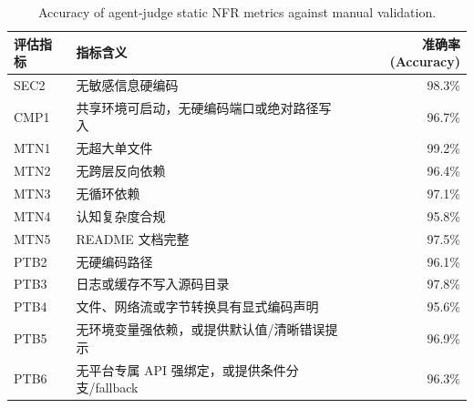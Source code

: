 \begin{table}[t]
\centering
\small
\caption{Accuracy of agent-judge static NFR metrics against manual validation.}
\label{tab:rq1-static-nfr-accuracy}
\begin{tabular}{llr}
\toprule
评估指标 & 指标含义 & 准确率 (Accuracy) \\
\midrule
SEC2 & 无敏感信息硬编码 & 98.3\% \\
CMP1 & 共享环境可启动，无硬编码端口或绝对路径写入 & 96.7\% \\
MTN1 & 无超大单文件 & 99.2\% \\
MTN2 & 无跨层反向依赖 & 96.4\% \\
MTN3 & 无循环依赖 & 97.1\% \\
MTN4 & 认知复杂度合规 & 95.8\% \\
MTN5 & README 文档完整 & 97.5\% \\
PTB2 & 无硬编码路径 & 96.1\% \\
PTB3 & 日志或缓存不写入源码目录 & 97.8\% \\
PTB4 & 文件、网络流或字节转换具有显式编码声明 & 95.6\% \\
PTB5 & 无环境变量强依赖，或提供默认值/清晰错误提示 & 96.9\% \\
PTB6 & 无平台专属 API 强绑定，或提供条件分支/fallback & 96.3\% \\
\bottomrule
\end{tabular}
\end{table}
